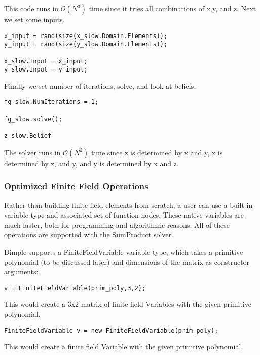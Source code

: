 This code runs in $\mathcal{O}(N^3) $ time since it tries all combinations of x,y, and z.
Next we set some inputs.

\begin{lstlisting}
x_input = rand(size(x_slow.Domain.Elements));
y_input = rand(size(y_slow.Domain.Elements));

x_slow.Input = x_input;
y_slow.Input = y_input;
\end{lstlisting}

Finally we set number of iterations, solve, and look at beliefs.

\begin{lstlisting}
fg_slow.NumIterations = 1;

fg_slow.solve();

z_slow.Belief
\end{lstlisting}

The solver runs in $\mathcal{O}(N^2)$ time since z is determined by x and y, x is determined by z, and y, and y is determined by x and z.

\fi

\subsubsection{Optimized Finite Field Operations}

Rather than building finite field elements from scratch, a user can use a built-in variable type and associated set of function nodes. These native variables are much faster, both for programming and algorithmic reasons. All of these operations are supported with the SumProduct solver.


Dimple supports a FiniteFieldVariable variable type, which takes a primitive polynomial (to be discussed later) and dimensions of the matrix as constructor arguments:

\ifmatlab
\begin{lstlisting}
v = FiniteFieldVariable(prim_poly,3,2);
\end{lstlisting}

This would create a 3x2 matrix of finite field Variables with the given primitive polynomial.

\fi

\ifjava
\begin{lstlisting}
FiniteFieldVariable v = new FiniteFieldVariable(prim_poly);
\end{lstlisting}

This would create a finite field Variable with the given primitive polynomial.

